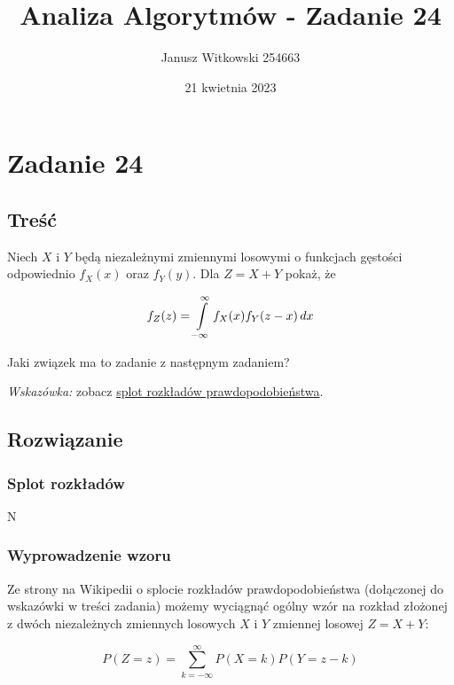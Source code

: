 \documentclass{article}
\title{Analiza Algorytmów - Zadanie 24}
\author{Janusz Witkowski 254663}
\date{21 kwietnia 2023}
\begin{document}
    \maketitle
    

    \section{Zadanie 24}
    \subsection{Treść}
    Niech $X$ i $Y$ będą niezależnymi zmiennymi losowymi o funkcjach gęstości odpowiednio $f_X(x)$ oraz $f_Y(y)$. Dla $Z = X + Y$ pokaż, że

    \[ f_Z(z) = \int\displaylimits_{-\infty}^{\infty} f_X(x)f_Y(z - x) \,dx \]

    Jaki związek ma to zadanie z następnym zadaniem?

    \textit{Wskazówka:} zobacz \href{https://en.wikipedia.org/wiki/Convolution_of_probability_distributions}{splot rozkładów prawdopodobieństwa}. 


    \subsection{Rozwiązanie}
    \subsubsection{Splot rozkładów}

    N

    \subsubsection{Wyprowadzenie wzoru}

    Ze strony na Wikipedii o splocie rozkładów prawdopodobieństwa (dołączonej do wskazówki w treści zadania) możemy wyciągnąć ogólny wzór na rozkład złożonej z dwóch
    niezależnych zmiennych losowych $X$ i $Y$ zmiennej losowej $Z = X + Y$:

    \begin{equation}
        P(Z=z) = \sum_{k=-\infty}^{\infty}{P(X=k)P(Y=z-k)}
    \end{equation}
\end{document}
